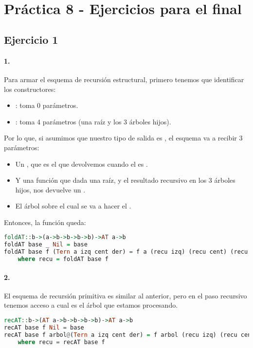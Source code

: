 \section{Práctica 8 - Ejercicios para el final}

\subsection*{Ejercicio 1}

\paragraph{1.} Para armar el esquema de recursión estructural, primero tenemos que identificar los constructores:
\begin{itemize}
  \item {}: toma 0 parámetros.
  \item {}: toma 4 parámetros (una raíz y los 3 árboles hijos).
\end{itemize}

Por lo que, si asumimos que nuestro tipo de salida es , el esquema  va a recibir 3 parámetros:
\begin{itemize}
  \item Un , que es el que devolvemos cuando el  es .
  \item Y una función  que dada una raíz, y el resultado recursivo en los 3 árboles hijos, nos devuelve un .
  \item El árbol  sobre el cual se va a hacer el .
\end{itemize}

Entonces, la función queda:
\begin{lstlisting}[language=Haskell]
foldAT::b->(a->b->b->b->b)->AT a->b
foldAT base _ Nil = base
foldAT base f (Tern a izq cent der) = f a (recu izq) (recu cent) (recu der)
    where recu = foldAT base f
\end{lstlisting}

\paragraph{2.} El esquema de recursión primitiva es similar al anterior, pero en el paso recursivo tenemos acceso a cual es el árbol que estamos procesando.

\begin{lstlisting}[language=Haskell]
recAT::b->(AT a->b->b->b->b)->AT a->b
recAT base f Nil = base
recAT base f arbol@(Tern a izq cent der) = f arbol (recu izq) (recu cent) (recu der)
    where recu = recAT base f
\end{lstlisting}


